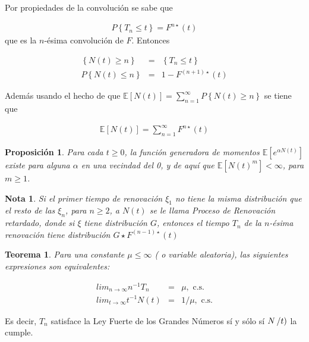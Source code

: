 \documentclass{article}
\newtheorem{Teo}{Teorema}
\newtheorem{Note}{Nota}
\newtheorem{Prop}{Proposición}
\newcommand{\esp}{\mathbb{E}}
\begin{document}
Por propiedades de la convoluci\'on se sabe que

\begin{eqnarray*}
P\left\{T_{n}\leq t\right\}=F^{n\star}\left(t\right)
\end{eqnarray*}
que es la $n$-\'esima convoluci\'on de $F$. Entonces 

\begin{eqnarray*}
\left\{N\left(t\right)\geq n\right\}&=&\left\{T_{n}\leq t\right\}\\
P\left\{N\left(t\right)\leq n\right\}&=&1-F^{\left(n+1\right)\star}\left(t\right)
\end{eqnarray*}

Adem\'as usando el hecho de que $\esp\left[N\left(t\right)\right]=\sum_{n=1}^{\infty}P\left\{N\left(t\right)\geq n\right\}$
se tiene que

\begin{eqnarray*}
\esp\left[N\left(t\right)\right]=\sum_{n=1}^{\infty}F^{n\star}\left(t\right)
\end{eqnarray*}

\begin{Prop}
Para cada $t\geq0$, la funci\'on generadora de momentos $\esp\left[e^{\alpha N\left(t\right)}\right]$ existe para alguna $\alpha$ en una vecindad del 0, y de aqu\'i que $\esp\left[N\left(t\right)^{m}\right]<\infty$, para $m\geq1$.
\end{Prop}


\begin{Note}
Si el primer tiempo de renovaci\'on $\xi_{1}$ no tiene la misma distribuci\'on que el resto de las $\xi_{n}$, para $n\geq2$, a $N\left(t\right)$ se le llama Proceso de Renovaci\'on retardado, donde si $\xi$ tiene distribuci\'on $G$, entonces el tiempo $T_{n}$ de la $n$-\'esima renovaci\'on tiene distribuci\'on $G\star F^{\left(n-1\right)\star}\left(t\right)$
\end{Note}


\begin{Teo}
Para una constante $\mu\leq\infty$ ( o variable aleatoria), las siguientes expresiones son equivalentes:

\begin{eqnarray}
lim_{n\rightarrow\infty}n^{-1}T_{n}&=&\mu,\textrm{ c.s.}\\
lim_{t\rightarrow\infty}t^{-1}N\left(t\right)&=&1/\mu,\textrm{ c.s.}
\end{eqnarray}
\end{Teo}


Es decir, $T_{n}$ satisface la Ley Fuerte de los Grandes N\'umeros s\'i y s\'olo s\'i $N\left/t\right)$ la cumple.
\end{document}
